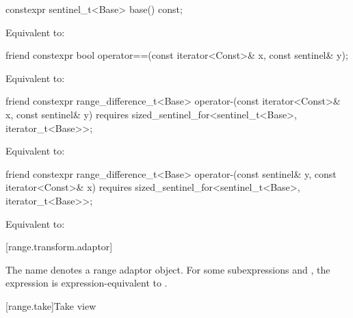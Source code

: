 \begin{itemdecl}
constexpr sentinel_t<Base> base() const;
\end{itemdecl}

\begin{itemdescr}
\pnum
\effects
Equivalent to: 
\end{itemdescr}

\begin{itemdecl}
friend constexpr bool operator==(const iterator<Const>& x, const sentinel& y);
\end{itemdecl}

\begin{itemdescr}
\pnum
\effects
Equivalent to: 
\end{itemdescr}

%
\begin{itemdecl}
friend constexpr range_difference_t<Base>
  operator-(const iterator<Const>& x, const sentinel& y)
    requires sized_sentinel_for<sentinel_t<Base>, iterator_t<Base>>;
\end{itemdecl}

\begin{itemdescr}
\pnum
\effects
Equivalent to: 
\end{itemdescr}

%
\begin{itemdecl}
friend constexpr range_difference_t<Base>
  operator-(const sentinel& y, const iterator<Const>& x)
    requires sized_sentinel_for<sentinel_t<Base>, iterator_t<Base>>;
\end{itemdecl}

\begin{itemdescr}
\pnum
\effects
Equivalent to: 
\end{itemdescr}

[range.transform.adaptor]{}

\pnum
The name  denotes a
range adaptor object.
For some subexpressions  and , the expression
 is expression-equivalent to
.


[range.take]{Take view}

